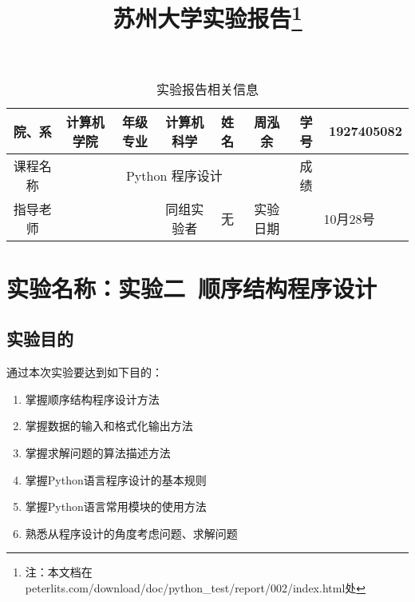 \documentclass[a4paper]{ctexart}
\title{苏州大学实验报告\footnote
   {注：本文档在 peterlits.com/download/doc/python\_test/report/002/index.html处}}
\author{}
\begin{document}
   \maketitle

   \begin{table}[!h]
      \centering
      \begin{tabular}{|c|c|c|c|c|c|c|c|}
         \hline
         院、系 & 计算机学院 & 年级专业 & 计算机科学 
         & 姓名 & 周泓余 & 学号 & 1927405082 \\ \hline
         课程名称 & \multicolumn{5}{c|}{Python 程序设计} & 成绩 & \\ \hline
         指导老师 & \multicolumn{2}{c|}{}& 同组实验者 & 无 & 实验日期
         & \multicolumn{2}{c|}{10月28号} \\
         \hline
      \end{tabular}
      \caption{实验报告相关信息}
   \end{table}

   \section*{实验名称：实验二~顺序结构程序设计}
   \subsection{实验目的}
      通过本次实验要达到如下目的：
      \begin{enumerate}
         \item 掌握顺序结构程序设计方法
         \item 掌握数据的输入和格式化输出方法
         \item 掌握求解问题的算法描述方法
         \item 掌握Python语言程序设计的基本规则
         \item 掌握Python语言常用模块的使用方法
         \item 熟悉从程序设计的角度考虑问题、求解问题
      \end{enumerate}
\end{document}
